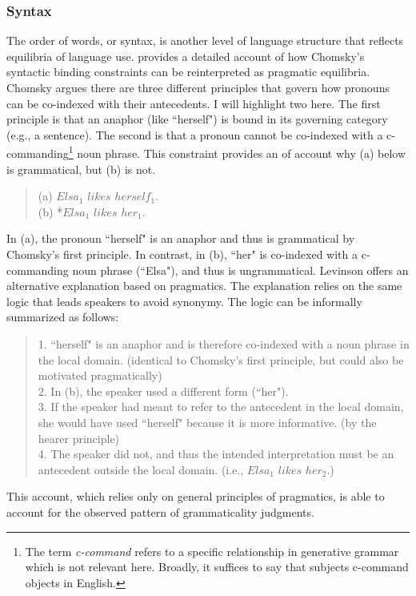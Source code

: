 \documentclass[man, noapacite, 12pt]{apa2}
\begin{document}
\subsubsection{Syntax}
The order of words, or syntax, is another level of language structure that reflects equilibria of language use.  provides a detailed account of how Chomsky's syntactic binding constraints can be reinterpreted as pragmatic equilibria. Chomsky argues there are three different principles that govern how pronouns can be co-indexed with their antecedents. I will highlight two here. The first principle is that an anaphor (like ``herself") is bound in its governing category (e.g., a sentence). The second is that a pronoun cannot be co-indexed with a c-commanding\footnote{The term {\it c-command} refers to a specific relationship in generative grammar which is not relevant here. Broadly, it suffices to say that subjects c-command objects in English.} noun phrase.  This constraint provides an of account why (a) below is grammatical, but (b) is not.
 \begin{quote} 
 	(a) $Elsa_1$ $likes$ $herself_1.$\\
 	(b) *$Elsa_1$ $likes$ $her_1.$
\end{quote}
In (a), the pronoun ``herself" is an anaphor and thus is grammatical by Chomsky's first principle. In contrast, in (b), ``her" is co-indexed with a c-commanding noun phrase (``Elsa"), and thus is ungrammatical. Levinson offers an alternative explanation based on pragmatics. The explanation relies on the same logic that leads speakers to avoid synonymy. The logic can be informally summarized as follows:
 \begin{quote} 
 	1. ``herself" is an anaphor and is therefore co-indexed with a noun phrase in the local domain. (identical to Chomsky's first principle, but could also be motivated pragmatically)\\
	2. In (b), the speaker used a different form (``her").\\
	3. If the speaker had meant to refer to the antecedent in the local domain, she would have used ``herself" because it is more informative. (by the hearer principle)\\
	4. The speaker did not, and thus the intended interpretation must be an antecedent outside the local domain.  (i.e., $Elsa_1$ $likes$ $her_2.$)
\end{quote}
This account, which relies only on general principles of pragmatics, is able to account for the observed pattern of grammaticality judgments.
	
\end{document}
